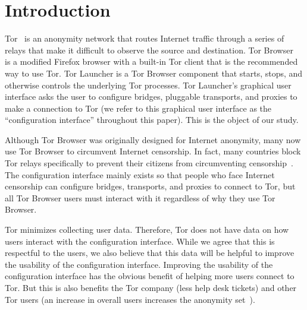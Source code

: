 \documentclass[USenglish,oneside,twocolumn]{article}
\begin{document}


\maketitle

\section{Introduction}

Tor~\cite{dingledine2004tor} is an anonymity network that routes Internet traffic through a series of relays 
that make it difficult to observe the source and destination. 
Tor Browser~\cite{torbrowser} is a modified Firefox browser with a built-in Tor client that
is the recommended way to use Tor. Tor Launcher is a Tor Browser component that
starts, stops, and otherwise controls the underlying Tor processes.
Tor Launcher's graphical user interface asks the user to configure
bridges, pluggable transports, and proxies to make a connection to Tor (we refer to this graphical user interface as the ``configuration interface'' throughout this paper). This is the object of our study. 

Although Tor Browser was originally designed for Internet anonymity, many now use Tor Browser to circumvent Internet censorship. In fact, many countries block Tor relays specifically to prevent their citizens from circumventing censorship~\cite{winter2012great}. The configuration interface mainly exists so that people who face Internet censorship can configure bridges, transports, and proxies to connect to Tor, but all Tor Browser users must interact with it regardless of why they use Tor Browser.

Tor minimizes collecting user data. Therefore, Tor does not have data on how users interact with the configuration interface. While we agree that this is respectful to the users, we also believe that this data will be helpful to improve the usability of the configuration interface. Improving the usability of the configuration interface has the obvious benefit of helping more users connect to Tor. But this is also benefits the Tor company (less help desk tickets) and other Tor users (an increase in overall users increases the anonymity set~\cite{dingledine2006anonymity}). 
\end{document}
